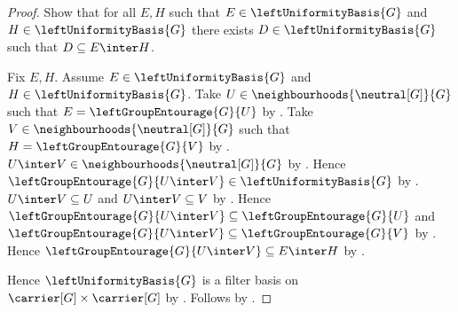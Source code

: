 \begin{proof}
    Show that for all $E,H$ such that
        $E\in\leftUniformityBasis{G}$ and
        $H\in\leftUniformityBasis{G}$ there exists
        $D\in\leftUniformityBasis{G}$ such that
        $D\subseteq E\inter H$.
    \begin{subproof}
        Fix $E,H$.
        Assume $E\in\leftUniformityBasis{G}$ and
            $H\in\leftUniformityBasis{G}$.
        Take $U\in\neighbourhoods{\neutral[G]}{G}$ such that
            $E=\leftGroupEntourage{G}{U}$
            by .
        Take $V\in\neighbourhoods{\neutral[G]}{G}$ such that
            $H=\leftGroupEntourage{G}{V}$
            by .
        $U\inter V\in\neighbourhoods{\neutral[G]}{G}$
            by .
        Hence $\leftGroupEntourage{G}{U\inter V}
            \in\leftUniformityBasis{G}$
            by .
        $U\inter V\subseteq U$ and $U\inter V\subseteq V$
            by .
        Hence $\leftGroupEntourage{G}{U\inter V}
                \subseteq\leftGroupEntourage{G}{U}$ and
            $\leftGroupEntourage{G}{U\inter V}
                \subseteq\leftGroupEntourage{G}{V}$
            by .
        Hence $\leftGroupEntourage{G}{U\inter V}\subseteq E\inter H$
            by .
    \end{subproof}
    Hence $\leftUniformityBasis{G}$ is a filter basis on
        $\carrier[G]\times\carrier[G]$ by .
    Follows by .
\end{proof}

